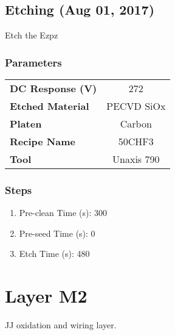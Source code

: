 \documentclass{article}%
\begin{document}
%
\subsection{Etching (Aug 01, 2017)}%
Etch the Ezpz%
\subsubsection{Parameters}%
\begin{tabular}{l|c}%
\hline%
\textbf{DC Response (V)}&272\\%
\textbf{Etched Material}&PECVD SiOx\\%
\textbf{Platen}&Carbon\\%
\textbf{Recipe Name}&50CHF3\\%
\textbf{Tool}&Unaxis 790\\%
\end{tabular}

%
\subsubsection{Steps}%
\begin{enumerate}[label=\arabic*),start=4]%
\item%
Pre{-}clean Time (s): 300%
\item%
Pre{-}seed Time (s): 0%
\item%
Etch Time (s): 480%
\end{enumerate}

%
\section{Layer M2}%
JJ oxidation and wiring layer.

%
\end{document}
